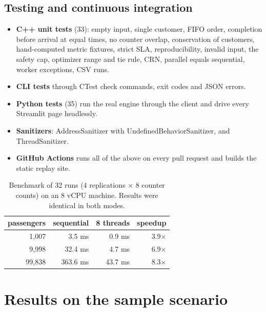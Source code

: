 \documentclass[11pt,a4paper]{article}
\begin{document}
\subsection{Testing and continuous integration}
\begin{itemize}
  \item \textbf{C++ unit tests} (33): empty input, single customer, FIFO order, completion before arrival at equal
    times, no counter overlap, conservation of customers, hand-computed metric fixtures, strict SLA, reproducibility,
    invalid input, the safety cap, optimizer range and tie rule, CRN, parallel equals sequential, worker exceptions, CSV
    runs.
  \item \textbf{CLI tests} through CTest check commands, exit codes and JSON errors.
  \item \textbf{Python tests} (35) run the real engine through the client and drive every Streamlit page headlessly.
  \item \textbf{Sanitizers}: AddressSanitizer with UndefinedBehaviorSanitizer, and ThreadSanitizer.
  \item \textbf{GitHub Actions} runs all of the above on every pull request and builds the static replay site.
\end{itemize}

\begin{table}[H]\centering\small
\begin{tabular}{@{}rrrr@{}}\toprule passengers & sequential & 8 threads & speedup\\\midrule
1{,}007 & 3.5 ms & 0.9 ms & 3.9$\times$\\ 9{,}998 & 32.4 ms & 4.7 ms & 6.9$\times$\\ 99{,}838 & 363.6 ms & 43.7 ms & 8.3$\times$\\
\bottomrule\end{tabular}
\caption{Benchmark of 32 runs (4 replications $\times$ 8 counter counts) on an 8 vCPU machine. Results were identical in
both modes.}\end{table}

\section{Results on the sample scenario}
\end{document}
